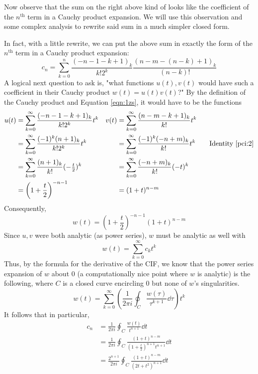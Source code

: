 \documentclass[titlepage]{article}
\numberwithin{equation}{section}
\begin{document}
Now observe that the sum on the right above kind of looks like the coefficient of the $n^\text{th}$ term in a Cauchy product expansion. We will use this observation and some complex analysis to rewrite said sum in a much simpler closed form.\par
In fact, with a little rewrite, we can put the above sum in exactly the form of the $n^\text{th}$ term in a Cauchy product expansion:
\begin{equation*}
    c_n = \sum_{k=0}^n\frac{(-n-1-k+1)_k}{k!2^k}\frac{(n-m-(n-k)+1)_k}{(n-k)!}
\end{equation*}
A logical next question to ask is, "what functions $u(t),v(t)$ would have such a coefficient in their Cauchy product $w(t)=u(t)v(t)$?" By the definition of the Cauchy product and Equation \ref{eqn:1zs}, it would have to be the functions
\begin{align*}
    u(t) &= \sum_{k=0}^\infty\frac{(-n-1-k+1)_k}{k!2^k}t^k&
        v(t) &= \sum_{k=0}^\infty\frac{(n-m-k+1)_k}{k!}t^k\\
    &= \sum_{k=0}^\infty\frac{(-1)^k(n+1)_k}{k!2^k}t^k&
        &= \sum_{k=0}^\infty\frac{(-1)^k(-n+m)_k}{k!}t^k\tag*{Identity \ref{pci:2}}\\
    &= \sum_{k=0}^\infty\frac{(n+1)_k}{k!}(-\tfrac{t}{2})^k&
        &= \sum_{k=0}^\infty\frac{(-n+m)_k}{k!}(-t)^k\\
    &= \left( 1+\frac{t}{2} \right)^{-n-1}&
        &= (1+t)^{n-m}
\end{align*}
Consequently,
\begin{equation*}
    w(t) = \left( 1+\frac{t}{2} \right)^{-n-1}(1+t)^{n-m}
\end{equation*}
Since $u,v$ were both analytic (as power series), $w$ must be analytic as well with
\begin{equation*}
    w(t) = \sum_{k=0}^\infty c_kt^k
\end{equation*}
Thus, by the formula for the derivative of the CIF, we know that the power series expansion of $w$ about 0 (a computationally nice point where $w$ is analytic) is the following, where $C$ is a closed curve encircling 0 but none of $w$'s singularities.
\begin{equation*}
    w(t) = \sum_{k=0}^\infty\left( \frac{1}{2\pi i}\oint_C\frac{w(\tau)}{\tau^{k+1}}\dd\tau \right)t^k
\end{equation*}
It follows that in particular,
\begin{align*}
    c_n &= \frac{1}{2\pi i}\oint_C\frac{w(t)}{t^{n+1}}\dd{t}\\
    &= \frac{1}{2\pi i}\oint_C\frac{(1+t)^{n-m}}{\left( 1+\tfrac{t}{2} \right)^{n+1}t^{n+1}}\dd{t}\\
    &= \frac{2^{n+1}}{2\pi i}\oint_C\frac{(1+t)^{n-m}}{(2t+t^2)^{n+1}}\dd{t}
\end{align*}
\end{document}
